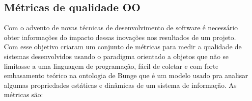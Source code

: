 \documentclass[conference]{IEEEtran}
\begin{document}


\subsection{Métricas de qualidade OO}
\label{sec:metrics}




Com o advento de novas técnicas de desenvolvimento de software é necessário
obter informações do impacto dessas inovações nos resultados de um projeto. Com
esse objetivo  criaram um conjunto de métricas para
medir a qualidade de sistemas desenvolvidos usando o paradigma orientado a
objetos que não se limitasse a uma linguagem de programação, fácil de coletar e
com forte embasamento teórico na ontologia de Bunge que é um modelo usado pra
analisar algumas propriedades estáticas e dinâmicas de um sistema de
informação\cite{WandWeber}. As métricas são:

\end{document}
